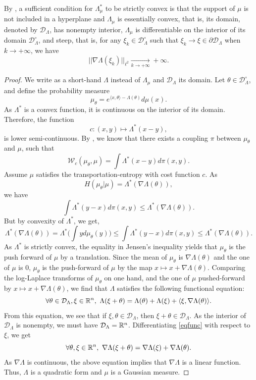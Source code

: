 \documentclass[a4paper,oneside,11pt]{article}
\begin{document}
\begin{Rem}
By \cite[Theorem 4.1]{Rockafeller}, a sufficient condition for $\Lambda^*_\mu$ to be strictly convex is that the support of $\mu$ is not included in a hyperplane and $\Lambda_\mu$ is essentially convex, that is,  its domain, denoted by $\mathcal{D}_\Lambda$, has nonempty interior, $\Lambda_\mu$ is differentiable on the interior of its domain $\mathcal{D}_\Lambda^\circ$, and steep, that is, for any $\xi_k \in \mathcal{D}_\Lambda^\circ$ such that $\xi_k \to \xi \in \partial \mathcal{D}_\Lambda$ when $k \to +\infty$, we have
$$ || \nabla \Lambda (\xi_k) ||_{\ell^2} \underset{k\to+\infty}{ \longrightarrow} +\infty.$$
\end{Rem}




\begin{proof}  
We write as a short-hand $\Lambda$ instead of $\Lambda_\mu$ and $\mathcal{D}_\Lambda$ its domain. Let $\theta \in \mathcal{D}_{\Lambda}^{\circ}$, and define the probability measure
$$\mu_{\theta} = e^{\langle x, \theta \rangle - \Lambda(\theta)} d\mu(x).$$
As $\Lambda^*$ is a convex function, it is continuous on the interior of its domain. Therefore, the function
$$  c: (x,y) \mapsto \Lambda^*(x-y),$$
is lower semi-continuous. By \cite[Theorem 4.1]{Villani}, we know that there exists a coupling $\pi$ between $\mu_{\theta}$ and $\mu$, such that
$$  \mathcal{W}_c(\mu_\theta, \mu) = \int \Lambda^*(x-y) d\pi(x,y).$$
Assume $\mu$ satisfies the transportation-entropy with cost function $c$. As 
$$ H(\mu_\theta | \mu) = \Lambda^*(\nabla \Lambda(\theta)),$$
we have 
$$ \int \Lambda^*(y-x) d\pi(x,y) \leq \Lambda^*(\nabla \Lambda(\theta)).$$
But by convexity of $\Lambda^*$, we get,
$$ \Lambda^*(\nabla \Lambda(\theta)) = \Lambda^*\big( \int y d\mu_{\theta}(y) \big)   \leq \int \Lambda^*(y-x) d\pi(x,y) \leq \Lambda^*(\nabla \Lambda(\theta)).$$
As $\Lambda^*$ is strictly convex, the equality in Jensen's inequality yields that $\mu_{\theta}$ is the push forward of $\mu$ by a translation. Since the mean of $\mu_\theta$ is $\nabla \Lambda(\theta)$ and the one of $\mu$ is $0$, $\mu_\theta$ is the push-forward of $\mu$ by the map $x \mapsto x + \nabla \Lambda(\theta)$. Comparing the log-Laplace transforms of $\mu_\theta$ on one hand, and the one of $\mu$ pushed-forward by $x \mapsto x +\nabla \Lambda(\theta)$, we find that $\Lambda$ satisfies the following functional equation:
\begin{equation} \label{eqfunc} \forall \theta \in \mathcal{D}_\Lambda, \xi \in \mathbb{R}^n, \ \Lambda(\xi+\theta) =  \Lambda(\theta) + \Lambda(\xi) + \langle \xi,  \nabla \Lambda(\theta) \rangle.\end{equation}
From this equation, we see that if $\xi, \theta \in \mathcal{D}_\Lambda$, then $\xi+ \theta \in \mathcal{D}_\Lambda$. As the interior of $\mathcal{D}_\Lambda$ is nonempty, we must have $ \mathcal{D}_\Lambda = \mathbb{R}^n$. 
Differentiating \eqref{eqfunc} with respect to $\xi$, we get
$$ \forall \theta, \xi \in \RR^n, \ \nabla \Lambda(\xi+\theta) = \nabla \Lambda(\xi) + \nabla \Lambda(\theta).$$
As $\nabla \Lambda$ is continuous, the above equation implies that $\nabla \Lambda$ is a linear function. Thus, $\Lambda$ is a quadratic form and $\mu$ is a Gaussian measure.
\end{proof}
\end{document}
